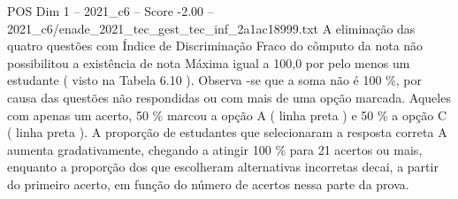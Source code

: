 \begin{textsample}{POS Dim 1 – 2021\_c6 – Score -2.00 – 2021\_c6/enade\_2021\_tec\_gest\_tec\_inf\_2a1ac18999.txt}
A eliminação das quatro questões com Índice de Discriminação Fraco do cômputo da nota não possibilitou a existência de nota Máxima igual a 100,0 por pelo menos um estudante ( visto na Tabela 6.10 ).
Observa -se que a soma não é 100 \%, por causa das questões não respondidas ou com mais de uma opção marcada.
Aqueles com apenas um acerto, 50 \% marcou a opção A ( linha preta ) e 50 \% a opção C ( linha preta ).
A proporção de estudantes que selecionaram a resposta correta A aumenta gradativamente, chegando a atingir 100 \% para 21 acertos ou mais, enquanto a proporção dos que escolheram alternativas incorretas decai, a partir do primeiro acerto, em função do número de acertos nessa parte da prova.

\end{textsample}
